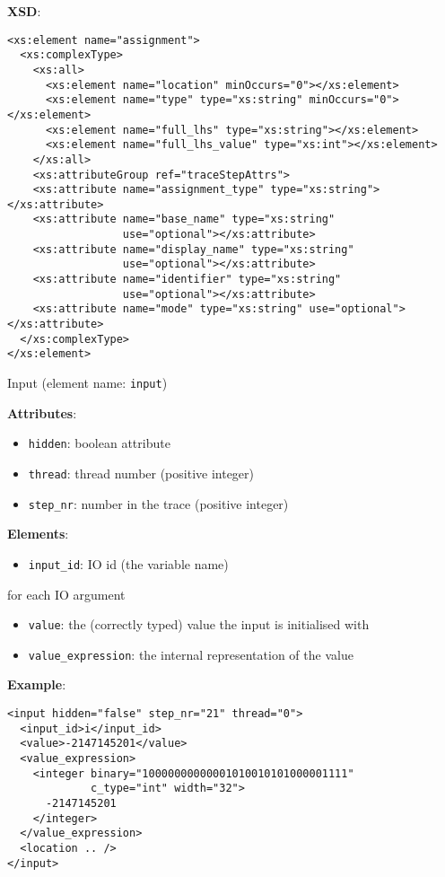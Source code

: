 \documentclass[12pt]{article}
\begin{document}
\noindent\textbf{XSD}:
\begin{verbatim}
<xs:element name="assignment">
  <xs:complexType>
    <xs:all>
      <xs:element name="location" minOccurs="0"></xs:element>
      <xs:element name="type" type="xs:string" minOccurs="0"></xs:element>
      <xs:element name="full_lhs" type="xs:string"></xs:element>
      <xs:element name="full_lhs_value" type="xs:int"></xs:element>
    </xs:all>
    <xs:attributeGroup ref="traceStepAttrs">
    <xs:attribute name="assignment_type" type="xs:string"></xs:attribute>
    <xs:attribute name="base_name" type="xs:string"
                  use="optional"></xs:attribute>
    <xs:attribute name="display_name" type="xs:string"
                  use="optional"></xs:attribute>
    <xs:attribute name="identifier" type="xs:string"
                  use="optional"></xs:attribute>
    <xs:attribute name="mode" type="xs:string" use="optional"></xs:attribute>
  </xs:complexType>
</xs:element>
\end{verbatim}


\begin{center}
{\Large Input} (element name: \texttt{input})
\end{center}

\noindent\textbf{Attributes}:
\begin{itemize}
\item \texttt{hidden}: boolean attribute
\item \texttt{thread}: thread number (positive integer)
\item \texttt{step\_nr}: number in the trace (positive integer)
\end{itemize}

\noindent\textbf{Elements}:
\begin{itemize}
\item \texttt{input\_id}: IO id (the variable name)
\end{itemize}
for each IO argument
\begin{itemize}
\item \texttt{value}: the (correctly typed) value the input is initialised with
\item \texttt{value\_expression}: the internal representation of the value
\end{itemize}

\noindent\textbf{Example}:
\begin{verbatim}
<input hidden="false" step_nr="21" thread="0">
  <input_id>i</input_id>
  <value>-2147145201</value>
  <value_expression>
    <integer binary="10000000000001010010101000001111"
             c_type="int" width="32">
      -2147145201
    </integer>
  </value_expression>
  <location .. />
</input>
\end{verbatim}
\end{document}
